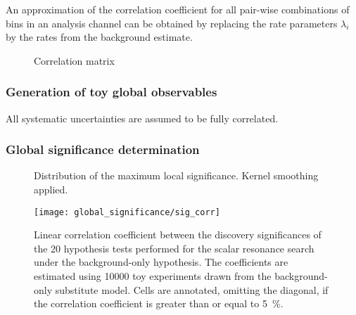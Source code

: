 An approximation of the correlation coefficient for all pair-wise
combinations of bins in an analysis channel can be obtained by
replacing the rate parameters $\lambda_i$ by the rates from the
background estimate.

\begin{figure}[htbp]
  \centering

  \caption{Correlation matrix}
  \label{fig:correlation_matrix_observables}
\end{figure}


\subsubsection{Generation of toy global observables}

All systematic uncertainties are assumed to be fully correlated.

\subsubsection{Global significance determination}


\begin{figure}[htbp]
  \centering


  \caption{Distribution of the maximum local significance. Kernel smoothing applied.}
  \label{fig:zmax_toys}
\end{figure}

\begin{figure}[htbp]
  \centering

  \texttt{[image: global\_significance/sig\_corr]}

  \caption{Linear correlation coefficient between the discovery
    significances of the 20 hypothesis tests performed for the scalar
    resonance search under the background-only hypothesis. The
    coefficients are estimated using 10000 toy experiments drawn from
    the background-only substitute model. Cells are annotated,
    omitting the diagonal, if the correlation coefficient is greater
    than or equal to \SI{5}{\percent}.}%
  \label{fig:corr_sig}
\end{figure}


